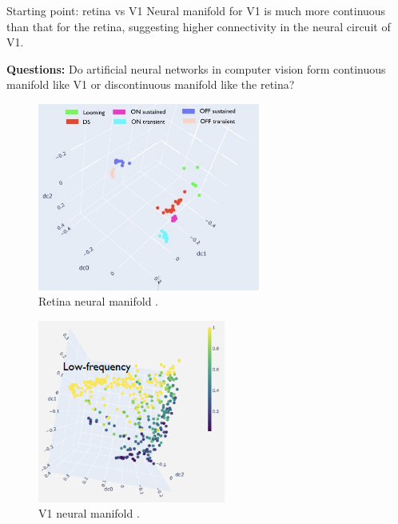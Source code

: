 \documentclass[xcolor={dvipsnames,svgnames}]{beamer}
\begin{document}
\begin{frame}{Starting point: retina vs V1}
Neural manifold for V1 is much more continuous than that for the retina, suggesting higher connectivity in the neural circuit of V1. 

\textbf{Questions:} Do artificial neural networks in computer vision form continuous manifold like V1 or discontinuous manifold like the retina? 

    \begin{minipage}[t]{.48\linewidth}  
    \begin{figure}
            \includegraphics[width=0.65\textwidth]{figures/biological/retina-manifold-luciano.jpg}
            \caption{Retina neural manifold \cite{dyballa_manifold_2021}.}
        \end{figure} 
    \end{minipage}
      \begin{minipage}[t]{.48\linewidth}   
      \begin{figure}         \includegraphics[width=0.55\textwidth]{figures/biological/v1-manifold-luciano.PNG}
      \caption{V1 neural manifold \cite{dyballa_manifold_2021}.}
            \end{figure} 
    \end{minipage}
\end{frame}
\end{document}
